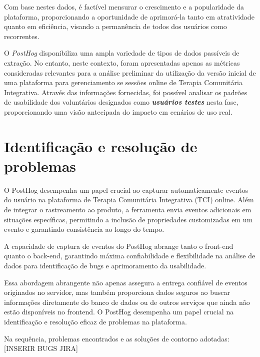 \begin{enumerate}
\begin{enumerate}
Com base nestes dados, é factível mensurar o crescimento e a popularidade da plataforma, proporcionando a oportunidade de aprimorá-la tanto em atratividade quanto em eficiência, visando a permanência de todos dos usuários como recorrentes.
\end{enumerate}

\end{enumerate}

O \textit{PostHog} disponibiliza uma ampla variedade de tipos de dados passíveis de extração. No entanto, neste contexto, foram apresentadas apenas as métricas consideradas relevantes para a análise preliminar da utilização da versão inicial de uma plataforma para gerenciamento se sessões online de Terapia Comunitária Integrativa. Através das informações fornecidas, foi possível analisar os padrões de usabilidade dos voluntários designados como \textit\textbf{{usuários testes}} nesta fase, proporcionando uma visão antecipada do impacto em cenários de uso real.
 


\section{Identificação e resolução de problemas}
O PostHog desempenha um papel crucial ao capturar automaticamente eventos do usuário na plataforma de Terapia Comunitária Integrativa (TCI) online. Além de integrar o rastreamento ao produto, a ferramenta envia eventos adicionais em situações específicas, permitindo a inclusão de propriedades customizadas em um evento e garantindo consistência ao longo do tempo.

A capacidade de captura de eventos do PostHog abrange tanto o front-end quanto o back-end, garantindo máxima confiabilidade e flexibilidade na análise de dados para identificação de bugs e aprimoramento da usabilidade.

Essa abordagem abrangente não apenas assegura a entrega confiável de eventos originados no servidor, mas também proporciona dados seguros ao buscar informações diretamente do banco de dados ou de outros serviços que ainda não estão disponíveis no frontend. O PostHog desempenha um papel crucial na identificação e resolução eficaz de problemas na plataforma.

Na sequência, problemas encontrados e as soluções de contorno adotadas: 
[INSERIR BUGS JIRA]


 
 
 
 
